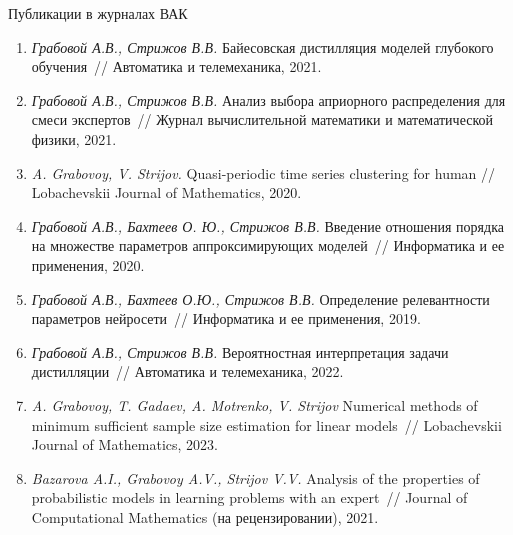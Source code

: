 \documentclass{dissert}
\begin{document}
Публикации в журналах ВАК
\begin{enumerate}
    \item \textit{Грабовой А.В., Стрижов В.В.} Байесовская дистилляция моделей глубокого обучения~// Автоматика и телемеханика, 2021.
    \item \textit{Грабовой А.В., Стрижов В.В.} Анализ выбора априорного распределения для смеси экспертов~// Журнал вычислительной математики и математической физики, 2021.
    \item \textit{A. Grabovoy, V. Strijov.} Quasi-periodic time series clustering for human // Lobachevskii Journal of Mathematics, 2020.
    \item \textit{Грабовой А.В., Бахтеев О. Ю., Стрижов В.В.} Введение отношения порядка на множестве параметров аппроксимирующих моделей~// Информатика и ее применения, 2020.
    \item \textit{Грабовой А.В., Бахтеев О.Ю., Стрижов В.В.} Определение релевантности параметров нейросети~// Информатика и ее применения, 2019.
    \item \textit{Грабовой А.В., Стрижов В.В.} Вероятностная интерпретация задачи дистилляции~// Автоматика и телемеханика, 2022.
    \item \textit{A. Grabovoy, T. Gadaev, A. Motrenko, V. Strijov} Numerical methods of minimum sufficient sample size estimation for linear models~// Lobachevskii Journal of Mathematics, 2023.
    \item \textit{Bazarova A.I., Grabovoy A.V., Strijov V.V.} Analysis of the properties of probabilistic models in learning problems with an expert~// Journal of Computational Mathematics (на рецензировании), 2021.
\end{enumerate}
\end{document}
